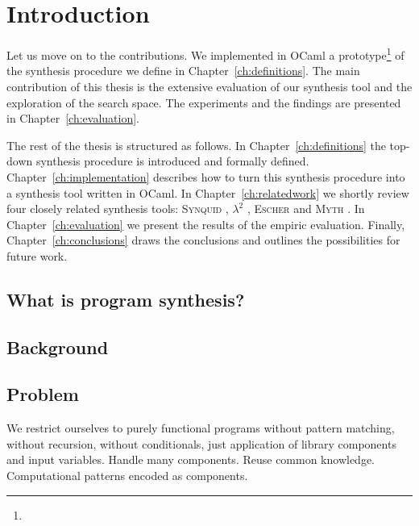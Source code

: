 \newcommand{\package}{\emph}

\chapter{Introduction}\label{ch:introduction}

Let us move on to the contributions. We implemented in OCaml a prototype\footnote{} of the synthesis procedure we define in Chapter~\ref{ch:definitions}. The main contribution of this thesis is the extensive evaluation of our synthesis tool and the exploration of the search space. The experiments and the findings are presented in Chapter~\ref{ch:evaluation}.

The rest of the thesis is structured as follows. In Chapter~\ref{ch:definitions} the top-down synthesis procedure is introduced and formally defined. Chapter~\ref{ch:implementation} describes how to turn this synthesis procedure into a synthesis tool written in OCaml. In Chapter~\ref{ch:relatedwork} we shortly review four closely related synthesis tools: \textsc{Synquid} \cite{SynquidPaper}, $\lambda^2$ \cite{LambdaSquarePaper}, \textsc{Escher} \cite{EscherPaper} and \textsc{Myth} \cite{Mythpaper}. In Chapter~\ref{ch:evaluation} we present the results of the empiric evaluation. Finally, Chapter~\ref{ch:conclusions} draws the conclusions and outlines the possibilities for future work.


\section{What is program synthesis?}

\section{Background}

\section{Problem}
We restrict ourselves to purely functional programs without pattern matching, without recursion, without conditionals, just application of library components and input variables. Handle many components. Reuse common knowledge. Computational patterns encoded as components.






